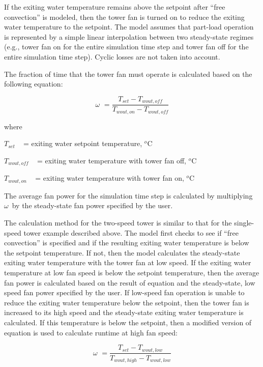 If the exiting water temperature remains above the setpoint after ``free convection'' is modeled, then the tower fan is turned on to reduce the exiting water temperature to the setpoint. The model assumes that part-load operation is represented by a simple linear interpolation between two steady-state regimes (e.g., tower fan on for the entire simulation time step and tower fan off for the entire simulation time step). Cyclic losses are not taken into account.

The fraction of time that the tower fan must operate is calculated based on the following equation:

\begin{equation}
\omega \,\, = \frac{{{T_{set}} - {T_{wout,off}}}}{{{T_{wout,on}} - {T_{wout,off}}}}
\end{equation}

where

\({T_{set}}\) ~ = exiting water setpoint temperature, \(^{o}\)C

\({T_{wout,off}}\) ~ = exiting water temperature with tower fan off, \(^{o}\)C

\({T_{wout,on}}\) ~ = exiting water temperature with tower fan on, \(^{o}\)C

The average fan power for the simulation time step is calculated by multiplying \(\omega \,\) by the steady-state fan power specified by the user.

The calculation method for the two-speed tower is similar to that for the single-speed tower example described above. The model first checks to see if ``free convection'' is specified and if the resulting exiting water temperature is below the setpoint temperature. If not, then the model calculates the steady-state exiting water temperature with the tower fan at low speed. If the exiting water temperature at low fan speed is below the setpoint temperature, then the average fan power is calculated based on the result of equation and the steady-state, low speed fan power specified by the user. If low-speed fan operation is unable to reduce the exiting water temperature below the setpoint, then the tower fan is increased to its high speed and the steady-state exiting water temperature is calculated. If this temperature is below the setpoint, then a modified version of equation is used to calculate runtime at high fan speed:

\begin{equation}
\omega \,\, = \frac{{{T_{set}} - {T_{wout,low}}}}{{{T_{wout,high}} - {T_{wout,low}}}}
\end{equation}

